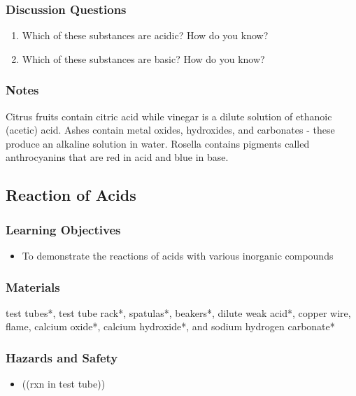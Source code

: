 \subsubsection*{Discussion Questions}
\begin{enumerate}
\item{Which of these substances are acidic? How do you know?}
\item{Which of these substances are basic? How do you know?}
\end{enumerate}

\subsubsection*{Notes}
Citrus fruits contain citric acid while vinegar is a dilute solution of ethanoic (acetic) acid. Ashes contain metal oxides, hydroxides, and carbonates - these produce an alkaline solution in water. Rosella contains pigments called anthrocyanins that are red in acid and blue in base.



\subsection{Reaction of Acids}

\subsubsection*{Learning Objectives}
\begin{itemize}
\item{To demonstrate the reactions of acids with various inorganic compounds}
\end{itemize}

\subsubsection*{Materials}
test tubes*, test tube rack*, spatulas*, beakers*, dilute weak acid*, copper wire, flame, calcium oxide*, calcium hydroxide*, and sodium hydrogen carbonate*

\subsubsection*{Hazards and Safety}
\begin{itemize}
\item{((rxn in test tube))}
\end{itemize}

